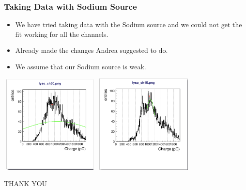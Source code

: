 \documentclass{beamer}
\begin{document}
\begin{frame}
\frametitle{Taking Data with Sodium Source}
\begin{itemize}
    \item We have tried taking data with the Sodium source and we could not get the fit working for all the channels.
    \item Already made the changes Andrea suggested to do.
    \item We assume that our Sodium source is weak.
\end{itemize}
\centering
\includegraphics[width=5cm, height=5cm]{../btl_files/sodium_fit_fail/Screenshot 2025-01-26 at 10.59.21.png}
\includegraphics[width=5cm, height=5cm]{../btl_files/sodium_fit_fail/Screenshot 2025-01-26 at 10.59.34.png}
\end{frame}
\begin{frame}
    \Huge
    \centering
    THANK YOU
\end{frame}
\end{document}
